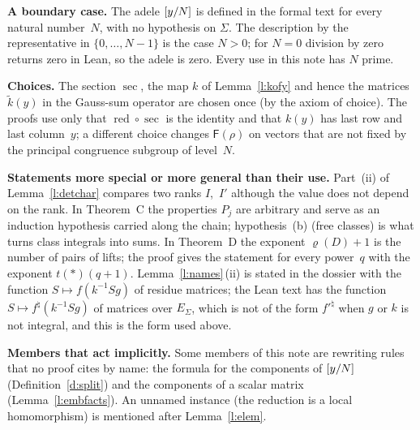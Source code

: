 \documentclass[11pt,a4paper]{article}
\newcommand{\m}[1]{\mbox{$#1$}}        %
\newcommand{\subhead}[1]{\par\addvspace{9pt plus 2pt}\Needspace{4\baselineskip}\noindent\textbf{#1}\enspace\ignorespaces}
\theoremstyle{plainx}
\theoremstyle{uprightx}
\newcommand{\ES}[1]{E_{#1}}                    %
\newcommand{\st}{\ast}                         %
\newcommand{\red}{\operatorname{red}}          %
\newcommand{\secN}{\operatorname{sec}}         %
\newcommand{\nat}[1]{#1^{\natural}}            %
\newcommand{\Fop}[1]{\mathsf{F}(#1)}           %
\begin{document}
\subhead{A boundary case.} The adele \m{\rN{y}} is defined in the formal text for every natural number~$N$, with
no hypothesis on $\Sigma$. The description by the representative in \m{\{0,\dots,N-1\}} is the case \m{N>0}; for
\m{N=0} division by zero returns zero in Lean, so the adele is zero. Every use in this note has $N$ prime.

\subhead{Choices.} The section \m{\secN}, the map $k$ of Lemma~\ref{l:kofy} and hence the matrices \m{\tilde k(y)} in
the Gauss-sum operator are chosen once (by the axiom of choice). The proofs use only that \m{\red\circ\secN} is the
identity and that \m{k(y)} has last row and last column~$y$; a different choice changes \m{\Fop{\rho}} on vectors
that are not fixed by the principal congruence subgroup of level~$N$.

\subhead{Statements more special or more general than their use.} Part~(ii) of Lemma~\ref{l:detchar} compares
two ranks $I$,~$I'$ although the value does not depend on the rank. In Theorem~C the properties $P_j$ are arbitrary
and serve as an induction hypothesis carried along the chain; hypothesis~(b) (free classes) is what turns class
integrals into sums. In Theorem~D the exponent \m{\varrho(D)+1} is the number of pairs of lifts; the proof gives the
statement for every power~$q$ with the exponent \m{t(\st)(q+1)}. Lemma~\ref{l:names}\,(ii) is stated in the dossier
with the function \m{S\mapsto f(k^{-1}Sg)} of residue matrices; the Lean text has the function
\m{S\mapsto\nat{f}(k^{-1}Sg)} of matrices over $\ES{\Sigma}$, which is not of the form $\nat{f'}$ when $g$ or $k$ is
not integral, and this is the form used above.

\subhead{Members that act implicitly.} Some members of this note are rewriting rules that no proof cites by name:
the formula for the components of \m{\rN{y}} (Definition~\ref{d:split}) and the components of a scalar matrix
(Lemma~\ref{l:embfacts}). An unnamed instance (the reduction is a local homomorphism) is mentioned after
Lemma~\ref{l:elem}.
\end{document}
